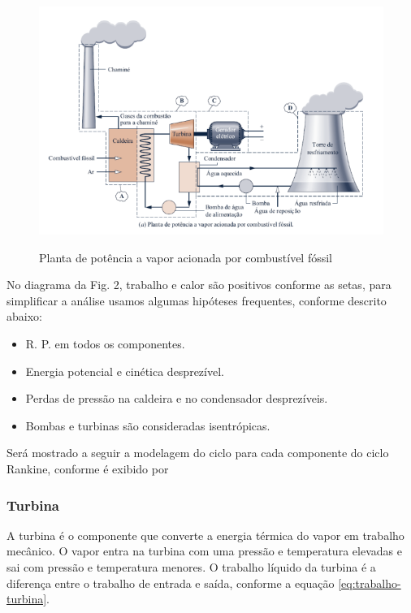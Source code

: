 \documentclass[
	article,			%
	11pt,				%
	oneside,			%
	a4paper,			%
	english,			%
	brazil,				%
	sumario=tradicional
	]{abntex2}
\begin{document}
\begin{figure}[h]
	\centering
	\caption{Planta de potência a vapor acionada por combustível fóssil}
	\includegraphics[width=1.0\textwidth]{./images/planta-exemplo.png}
	\label{fig:planta-exemplo}
\end{figure}

No diagrama da Fig. 2, trabalho e calor são positivos conforme as setas, para simplificar a análise usamos algumas hipóteses frequentes, conforme descrito abaixo:
\begin{itemize}
	\item R. P. em todos os componentes.
	\item Energia potencial e cinética desprezível.
    \item Perdas de pressão na caldeira e no condensador desprezíveis.
    \item Bombas e turbinas são consideradas isentrópicas.
\end{itemize}

Será mostrado a seguir a modelagem do ciclo para cada componente do ciclo Rankine, conforme é exibido por 

\subsubsection{Turbina}

A turbina é o componente que converte a energia térmica do vapor em trabalho mecânico. O vapor entra na turbina com uma pressão e temperatura elevadas e sai com pressão e temperatura menores. O trabalho líquido da turbina é a diferença entre o trabalho de entrada e saída, conforme a equação \ref{eq:trabalho-turbina}.
\end{document}
